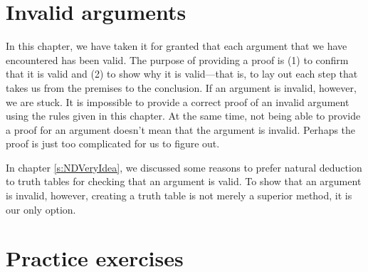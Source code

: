 \section{Invalid arguments}

In this chapter, we have taken it for granted that each argument that we have encountered has been valid. The purpose of providing a proof is (1) to confirm that it is valid and (2) to show why it is valid---that is, to lay out each step that takes us from the premises to the conclusion. If an argument is invalid, however, we are stuck. It is impossible to provide a correct proof of an invalid argument using the rules given in this chapter. At the same time, not being able to provide a proof for an argument doesn't mean that the argument is invalid. Perhaps the proof is just too complicated for us to figure out. 

In chapter \ref{s:NDVeryIdea}, we discussed some reasons to prefer natural deduction to truth tables for checking that an argument is valid. To show that an argument is invalid, however, creating a truth table is not merely a superior method, it is our only option.



\section{Practice exercises}
\setcounter{ProbPart}{0}

